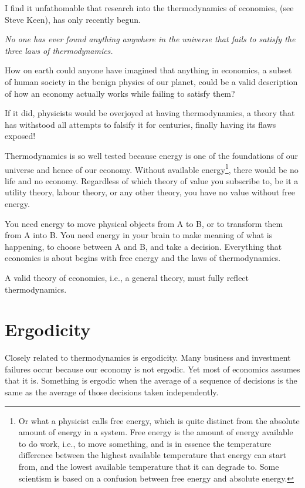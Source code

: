 I find it unfathomable that research into the thermodynamics of economies, (see Steve Keen\cite{keen-thermodynamic-economics}), has only recently begun.  


\emph{No one has ever found anything anywhere in the universe that fails to satisfy the three laws of thermodynamics.} 


How on earth could anyone have imagined that anything in economics, a subset of human society in the benign physics of our planet, could be a valid description of how an economy  actually works while failing to satisfy them? 


If it did, physicists  would be overjoyed at having thermodynamics, a theory that has withstood all attempts to falsify it for centuries, finally having its flaws exposed!


Thermodynamics  is so well tested because energy is one of the foundations of our universe and hence of our economy. Without available energy\footnote{Or what a physicist calls free energy, which is quite distinct from the absolute amount of energy in a system. Free energy is the amount of energy available to do work, i.e., to move something, and is in essence the temperature difference between the highest available temperature that energy can start from, and the lowest available temperature that it can degrade to. Some scientism is based on a confusion between free energy and absolute energy.}, there would be no life and no economy. Regardless of which theory of value you subscribe to, be it a utility theory, labour theory, or any other theory, you have no value without free energy.


You need energy to move physical objects from A to B, or to transform them from A into B. You need energy in your brain to make meaning of what is happening, to choose between A and B, and take a decision. Everything that economics is about begins with free energy and the laws of thermodynamics.  


A valid theory of economies, i.e., a general theory, must fully reflect thermodynamics.
\section{Ergodicity}
\label{section:ergodicity}
Closely related to thermodynamics is ergodicity. Many business and investment failures occur because our economy is not ergodic. Yet most of economics assumes that it is. Something is ergodic when the average of a sequence of decisions is the same as the average of those decisions taken independently. 



